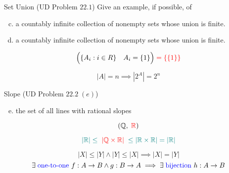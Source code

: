 \begin{frame}{}
  \begin{exampleblock}{Set Union (UD Problem $22.1$)}
    Give an example, if possible, of
    \begin{enumerate}[(a)]
      \setcounter{enumi}{2}
      \item a countably infinite collection of  nonempty sets whose union is finite.
      \setcounter{enumi}{1}
      \pause
      \item a countably infinite collection of nonempty sets whose union is finite.
    \end{enumerate}
  \end{exampleblock}

  \pause
  \[
    \Big(\{A_i: i \in R\} \quad A_{i} = \{1\}\Big) \;\textcolor{red}{= \{\{1\}\}}
  \]

  \pause
  \[
    |A| = n \implies |2^{A}| = 2^n
  \]
\end{frame}

\begin{frame}{}
  \begin{exampleblock}{Slope (UD Problem $22.2 \;(e)$)}
    \begin{enumerate}[(a)]
      \setcounter{enumi}{4}
      \item the set of all lines with rational slopes
    \end{enumerate}
  \end{exampleblock}

  \pause
  \[
    (\mathbb{Q}, \;\textcolor{red}{\mathbb{R}})
  \]

  \pause
  \[
    \textcolor{teal}{|\mathbb{R}| \le \;\textcolor{red}{|\mathbb{Q} \times \mathbb{R}|}\; \le |\mathbb{R} \times \mathbb{R}| = |\mathbb{R}|}
  \]
\end{frame}

\begin{frame}{}
  \centerline{\large {}}

  \pause
  \vspace{0.30cm}
  \begin{theorem}
    \[
      |X| \le |Y| \land |Y| \le |X| \implies |X| = |Y|
    \]
    \pause
    \[
      \exists\; \text{\textcolor{blue}{one-to-one} } f: A \to B \land g: B \to A \implies \exists\; \text{\textcolor{blue}{bijection} } h: A \to B
    \]
  \end{theorem}

  \pause
  \begin{columns}
      \pause
      \pause
  \end{columns}
\end{frame}

